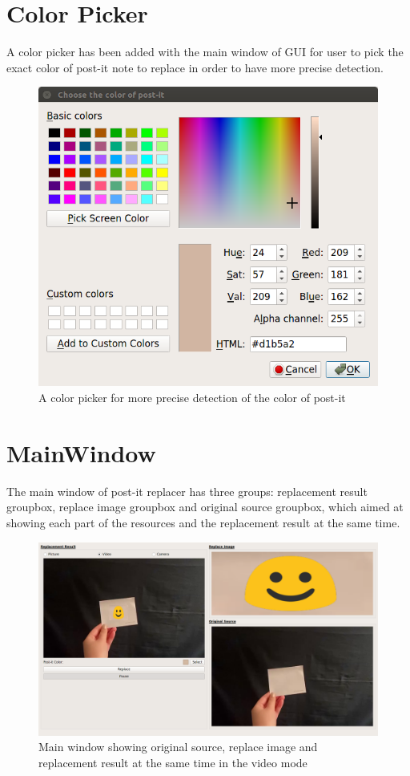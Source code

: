 \documentclass[a4paper, twoside]{report}
\begin{document}
{{\section{Color Picker}
\noindent A color picker has been added with the main window of GUI for user to pick the exact color of post-it note to replace in order to have more precise detection.      \\ \par

\begin{figure}[h!]
\centering
\includegraphics[width=.69\textwidth]{colorpicker.png}
\caption{A color picker for more precise detection of the color of post-it}
\end{figure}

\newpage
\section{MainWindow}
\noindent The main window of post-it replacer has three groups: replacement result groupbox, replace image groupbox and original source groupbox, which aimed at showing each part of the resources and the replacement result at the same time.      \\ \par

\begin{figure}[h!]
\centering
\includegraphics[width=.9\textwidth]{replace.png}
\caption{Main window showing original source, replace image and replacement result at the same time in the video mode}
\end{figure}


}}
\end{document}
